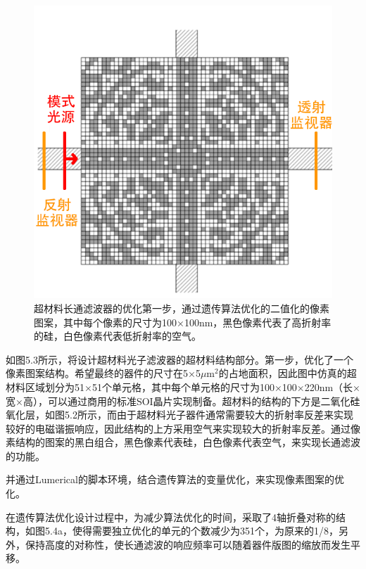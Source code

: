 \begin{figure}[!htbp]
    \centering
    \includegraphics[width=1\textwidth]{Img/5-3.png}
    \caption{超材料长通滤波器的优化第一步，通过遗传算法优化的二值化的像素图案，其中每个像素的尺寸为100×100nm，黑色像素代表了高折射率的硅，白色像素代表低折射率的空气。}
    \label{fig:5-3}
\end{figure}


如图5.3所示，将设计超材料光子滤波器的超材料结构部分。第一步，优化了一个像素图案结构。希望最终的器件的尺寸在5×5$\mu$m$^2$的占地面积，因此图中仿真的超材料区域划分为51×51个单元格，其中每个单元格的尺寸为100×100×220nm（长×宽×高），可以通过商用的标准SOI晶片实现制备。超材料的结构的下方是二氧化硅氧化层，如图5.2所示，而由于超材料光子器件通常需要较大的折射率反差来实现较好的电磁谐振响应，因此结构的上方采用空气来实现较大的折射率反差。通过像素结构的图案的黑白组合，黑色像素代表硅，白色像素代表空气，来实现长通滤波的功能。

并通过Lumerical的脚本环境，结合遗传算法的变量优化，来实现像素图案的优化。

在遗传算法优化设计过程中，为减少算法优化的时间，采取了4轴折叠对称的结构，如图5.4a，使得需要独立优化的单元的个数减少为351个，为原来的1/8，另外，保持高度的对称性，使长通滤波的响应频率可以随着器件版图的缩放而发生平移。

